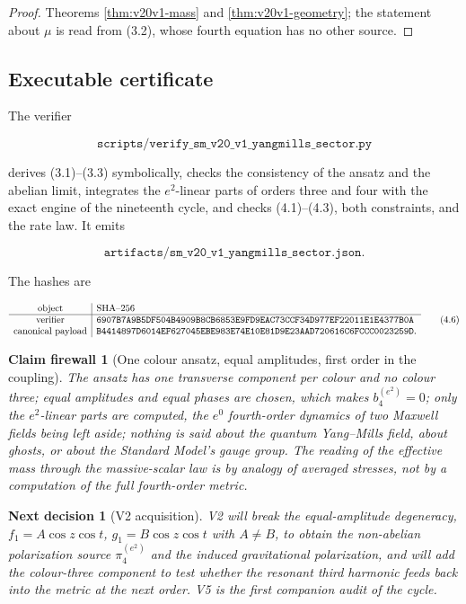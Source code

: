 \documentclass[11pt]{article}
\newtheorem{firewall}[theorem]{Claim firewall}
\newtheorem{decision}[theorem]{Next decision}
\theoremstyle{remark}
\begin{document}
\begin{proof}
Theorems \ref{thm:v20v1-mass} and \ref{thm:v20v1-geometry}; the
statement about \(\mu\) is read from (3.2), whose fourth equation has
no other source.
\end{proof}

\subsection{Executable certificate}

The verifier

\[
 \texttt{scripts/verify\_sm\_v20\_v1\_yangmills\_sector.py}           \tag{4.4}
\]

derives (3.1)--(3.3) symbolically, checks the consistency of the
ansatz and the abelian limit, integrates the \(e^2\)-linear parts of
orders three and four with the exact engine of the nineteenth cycle,
and checks (4.1)--(4.3), both constraints, and the rate law.  It emits

\[
 \texttt{artifacts/sm\_v20\_v1\_yangmills\_sector.json}.              \tag{4.5}
\]

The hashes are

\[
\begin{array}{c|l}
\hbox{object}&\hbox{SHA--256}\\ \hline
\hbox{verifier}&
\texttt{6907B7A9B5DF504B4909B8CB6853E9FD9EAC73CCF34D977EF22011E1E4377B0A}\\
\hbox{canonical payload}&
\texttt{B4414897D6014EF627045EBE983E74E10E81D9E23AAD720616C6FCCC0023259D}.
\end{array}                                                     \tag{4.6}
\]

\begin{firewall}[One colour ansatz, equal amplitudes, first order in the coupling]
\label{fire:v20v1}
The ansatz has one transverse component per colour and no colour
three; equal amplitudes and equal phases are chosen, which makes
\(b_4^{(e^2)}=0\); only the \(e^2\)-linear parts are computed, the
\(e^0\) fourth-order dynamics of two Maxwell fields being left aside;
nothing is said about the quantum Yang--Mills field, about ghosts, or
about the Standard Model's gauge group.  The reading of the
effective mass through the massive-scalar law is by analogy of
averaged stresses, not by a computation of the full fourth-order
metric.
\end{firewall}

\begin{decision}[V2 acquisition]
\label{dec:v20v1-next}
V2 will break the equal-amplitude degeneracy, \(f_1=A\cos z\cos t\),
\(g_1=B\cos z\cos t\) with \(A\neq B\), to obtain the non-abelian
polarization source \(\pi_4^{(e^2)}\) and the induced gravitational
polarization, and will add the colour-three component to test whether
the resonant third harmonic feeds back into the metric at the next
order.  V5 is the first companion audit of the cycle.
\end{decision}
\end{document}
